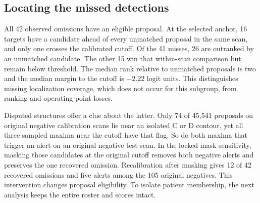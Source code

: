 \subsection{Locating the missed detections}

All 42 observed omissions have an eligible proposal. At the selected anchor, 16 targets have a candidate ahead of every unmatched proposal in the same scan, and only one crosses the calibrated cutoff. Of the 41 misses, 26 are outranked by an unmatched candidate. The other 15 win that within-scan comparison but remain below threshold. The median rank relative to unmatched proposals is two and the median margin to the cutoff is $-2.22$ logit units. This distinguishes missing localization coverage, which does not occur for this subgroup, from ranking and operating-point losses.

Disputed structures offer a clue about the latter. Only 74 of 45,541 proposals on original negative calibration scans lie near an isolated C or D contour, yet all three sampled maxima near the cutoff have that flag. So do both maxima that trigger an alert on an original negative test scan. In the locked mask sensitivity, masking those candidates at the original cutoff removes both negative alerts and preserves the one recovered omission. Recalibration after masking gives 12 of 42 recovered omissions and five alerts among the 105 original negatives. This intervention changes proposal eligibility. To isolate patient membership, the next analysis keeps the entire roster and scores intact.
